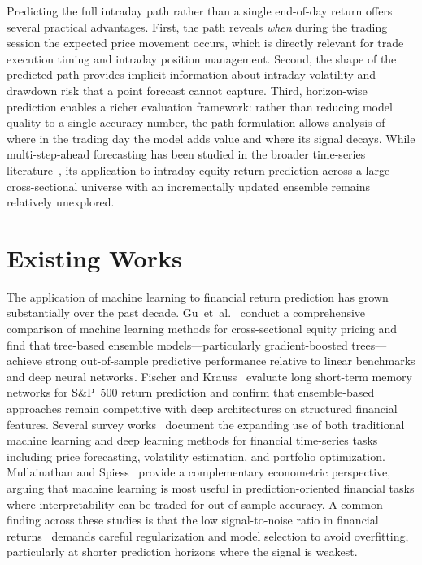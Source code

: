 \documentclass[conference]{IEEEtran}
\begin{document}
Predicting the full intraday path rather than a single end-of-day return offers several practical advantages. First, the path reveals \emph{when} during the trading session the expected price movement occurs, which is directly relevant for trade execution timing and intraday position management. Second, the shape of the predicted path provides implicit information about intraday volatility and drawdown risk that a point forecast cannot capture. Third, horizon-wise prediction enables a richer evaluation framework: rather than reducing model quality to a single accuracy number, the path formulation allows analysis of where in the trading day the model adds value and where its signal decays. While multi-step-ahead forecasting has been studied in the broader time-series literature~\cite{taieb2012review}, its application to intraday equity return prediction across a large cross-sectional universe with an incrementally updated ensemble remains relatively unexplored.

\section{Existing Works}\label{sec:related}

The application of machine learning to financial return prediction has grown substantially over the past decade. Gu~et~al.~\cite{gu2020empirical} conduct a comprehensive comparison of machine learning methods for cross-sectional equity pricing and find that tree-based ensemble models---particularly gradient-boosted trees---achieve strong out-of-sample predictive performance relative to linear benchmarks and deep neural networks. Fischer and Krauss~\cite{fischer2018deep} evaluate long short-term memory networks for S\&P~500 return prediction and confirm that ensemble-based approaches remain competitive with deep architectures on structured financial features. Several survey works~\cite{sezer2020financial, jiang2021applications, ghoddusi2019machine} document the expanding use of both traditional machine learning and deep learning methods for financial time-series tasks including price forecasting, volatility estimation, and portfolio optimization. Mullainathan and Spiess~\cite{mullainathan2017machine} provide a complementary econometric perspective, arguing that machine learning is most useful in prediction-oriented financial tasks where interpretability can be traded for out-of-sample accuracy. A common finding across these studies is that the low signal-to-noise ratio in financial returns~\cite{fama1970efficient} demands careful regularization and model selection to avoid overfitting, particularly at shorter prediction horizons where the signal is weakest.
\end{document}
